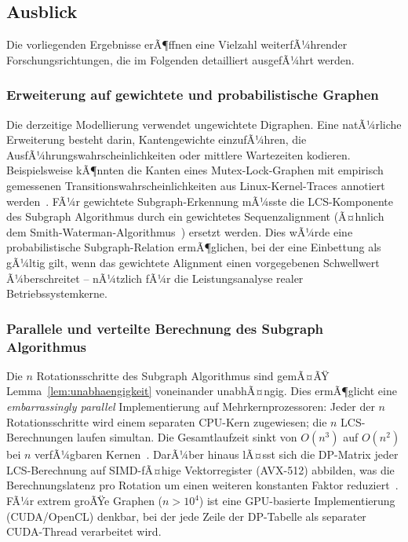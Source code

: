 ﻿\documentclass[a4paper,12pt]{article}
\theoremstyle{definition}
\begin{document}
\subsection{Ausblick}

Die vorliegenden Ergebnisse erÃ¶ffnen eine Vielzahl weiterfÃ¼hrender
Forschungsrichtungen, die im Folgenden detailliert ausgefÃ¼hrt werden.

\subsubsection{Erweiterung auf gewichtete und probabilistische Graphen}

Die derzeitige Modellierung verwendet ungewichtete Digraphen.
Eine natÃ¼rliche Erweiterung besteht darin, Kantengewichte einzufÃ¼hren,
die AusfÃ¼hrungswahrscheinlichkeiten oder mittlere Wartezeiten kodieren.
Beispielsweise kÃ¶nnten die Kanten eines Mutex-Lock-Graphen mit empirisch
gemessenen Transitionswahrscheinlichkeiten aus Linux-Kernel-Traces annotiert
werden~\cite{love2010linux}.
FÃ¼r gewichtete Subgraph-Erkennung mÃ¼sste die LCS-Komponente des Subgraph
Algorithmus durch ein gewichtetes Sequenzalignment (Ã¤hnlich dem
Smith-Waterman-Algorithmus~\cite{smith1981identification}) ersetzt werden.
Dies wÃ¼rde eine probabilistische Subgraph-Relation ermÃ¶glichen, bei der
eine Einbettung als gÃ¼ltig gilt, wenn das gewichtete Alignment einen
vorgegebenen Schwellwert Ã¼berschreitet -- nÃ¼tzlich fÃ¼r die
Leistungsanalyse realer Betriebssystemkerne.

\subsubsection{Parallele und verteilte Berechnung des Subgraph Algorithmus}

Die $n$ Rotationsschritte des Subgraph Algorithmus sind gemÃ¤ÃŸ
Lemma~\ref{lem:unabhaengigkeit} voneinander unabhÃ¤ngig.
Dies ermÃ¶glicht eine \emph{embarrassingly parallel} Implementierung auf
Mehr\-kern\-pro\-zes\-so\-ren: Jeder der $n$ Rotationsschritte wird einem
separaten CPU-Kern zugewiesen; die $n$ LCS-Berechnungen laufen simultan.
Die Gesamtlaufzeit sinkt von $O(n^3)$ auf $O(n^2)$ bei $n$ verfÃ¼gbaren
Kernen~\cite{openmp2011}.
DarÃ¼ber hinaus lÃ¤sst sich die DP-Matrix jeder LCS-Berechnung auf SIMD-fÃ¤hige
Vektorregister (AVX-512) abbilden, was die Berechnungslatenz pro Rotation
um einen weiteren konstanten Faktor reduziert~\cite{rognes2011faster}.
FÃ¼r extrem groÃŸe Graphen ($n > 10^4$) ist eine GPU-basierte Implementierung
(CUDA/OpenCL) denkbar, bei der jede Zeile der DP-Tabelle als separater
CUDA-Thread verarbeitet wird.
\end{document}
